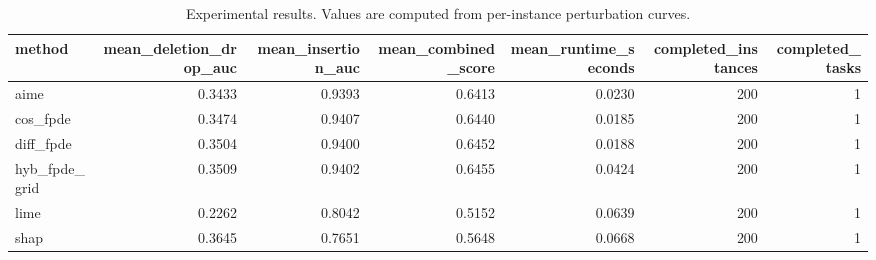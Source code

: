 \begin{table}[t]
\caption{Experimental results. Values are computed from per-instance perturbation curves.}
\label{tab:main_results_computed}
\centering
\begin{tabular}{lrrrrrr}
\toprule
method & mean\_deletion\_drop\_auc & mean\_insertion\_auc & mean\_combined\_score & mean\_runtime\_seconds & completed\_instances & completed\_tasks \\
\midrule
aime & 0.3433 & 0.9393 & 0.6413 & 0.0230 & 200 & 1 \\
cos\_fpde & 0.3474 & 0.9407 & 0.6440 & 0.0185 & 200 & 1 \\
diff\_fpde & 0.3504 & 0.9400 & 0.6452 & 0.0188 & 200 & 1 \\
hyb\_fpde\_grid & 0.3509 & 0.9402 & 0.6455 & 0.0424 & 200 & 1 \\
lime & 0.2262 & 0.8042 & 0.5152 & 0.0639 & 200 & 1 \\
shap & 0.3645 & 0.7651 & 0.5648 & 0.0668 & 200 & 1 \\
\bottomrule
\end{tabular}

\end{table}
